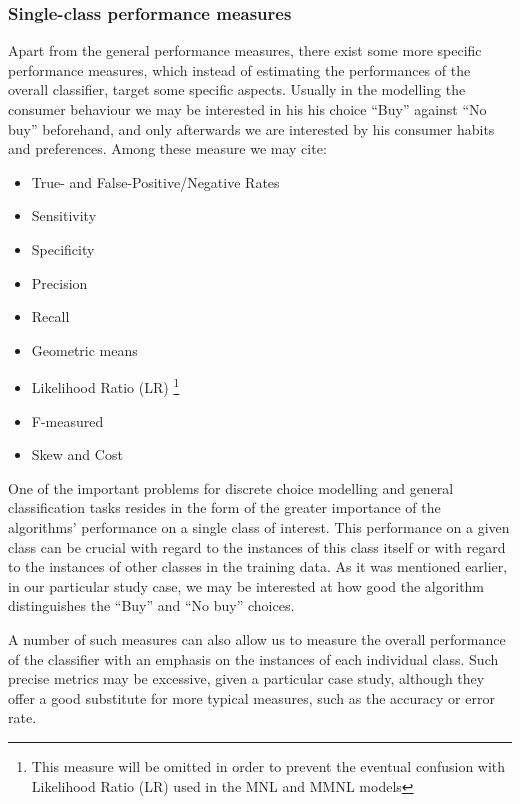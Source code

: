 \documentclass[11pt,]{article}
\let\rmarkdownfootnote\footnote%
\def\footnote{\protect\rmarkdownfootnote}
\begin{document}
\hypertarget{single-class-performance-measures}{%
\subsubsection{Single-class performance
measures}\label{single-class-performance-measures}}

Apart from the general performance measures, there exist some more
specific performance measures, which instead of estimating the
performances of the overall classifier, target some specific aspects.
Usually in the modelling the consumer behaviour we may be interested in
his his choice ``Buy'' against ``No buy'' beforehand, and only
afterwards we are interested by his consumer habits and preferences.
Among these measure we may cite:

\begin{multicols}{2}
\begin{itemize}
\item True- and False-Positive/Negative Rates
\item Sensitivity
\item Specificity
\item Precision 
\item Recall 
\item Geometric means
\item Likelihood Ratio (LR) \footnote{This measure will be omitted in order to prevent the eventual confusion with Likelihood Ratio (LR) used in the MNL and MMNL models}
\item F-measured
\item Skew and Cost 
\end{itemize}
\end{multicols}

One of the important problems for discrete choice modelling and general
classification tasks resides in the form of the greater importance of
the algorithms' performance on a single class of interest. This
performance on a given class can be crucial with regard to the instances
of this class itself or with regard to the instances of other classes in
the training data. As it was mentioned earlier, in our particular study
case, we may be interested at how good the algorithm distinguishes the
``Buy'' and ``No buy'' choices.

A number of such measures can also allow us to measure the overall
performance of the classifier with an emphasis on the instances of each
individual class. Such precise metrics may be excessive, given a
particular case study, although they offer a good substitute for more
typical measures, such as the accuracy or error rate.
\end{document}
